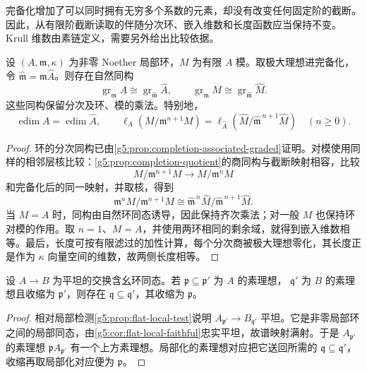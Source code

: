 完备化增加了可以同时拥有无穷多个系数的元素，却没有改变任何固定阶的截断。因此，从有限阶截断读取的伴随分次环、嵌入维数和长度函数应当保持不变。Krull 维数由素链定义，需要另外给出比较依据。

\begin{proposition}\label{g5:prop:completion-graded-comparison}
	设 \((A,\mathfrak m,\kappa)\) 为非零 Noether 局部环，\(M\) 为有限 \(A\) 模。取极大理想进完备化，令 \(\widehat{\mathfrak m}=\mathfrak m\widehat A\)。则存在自然同构
	\[
		\operatorname{gr}_{\mathfrak m}A
		\cong\operatorname{gr}_{\widehat{\mathfrak m}}\widehat A,
		\qquad
		\operatorname{gr}_{\mathfrak m}M
		\cong\operatorname{gr}_{\widehat{\mathfrak m}}\widehat M.
	\]
	这些同构保留分次及环、模的乘法。特别地，
	\[
		\operatorname{edim}A=\operatorname{edim}\widehat A,\qquad
		\ell_A(M/\mathfrak m^{n+1}M)
		=\ell_{\widehat A}(\widehat M/\widehat{\mathfrak m}^{\,n+1}\widehat M)
		\quad(n\geq0).
	\]
\end{proposition}
\begin{proof}
	环的分次同构已由\cref{g5:prop:completion-associated-graded}证明。对模使用同样的相邻层核比较：\cref{g5:prop:completion-quotient}的商同构与截断映射相容，比较
	\[
		M/\mathfrak m^{n+1}M\longrightarrow M/\mathfrak m^nM
	\]
	和完备化后的同一映射，并取核，得到
	\[
		\mathfrak m^nM/\mathfrak m^{n+1}M
		\cong
		\widehat{\mathfrak m}^{\,n}\widehat M/
		\widehat{\mathfrak m}^{\,n+1}\widehat M.
	\]
	当 \(M=A\) 时，同构由自然环同态诱导，因此保持齐次乘法；对一般 \(M\) 也保持环对模的作用。取 \(n=1\)、\(M=A\)，并使用两环相同的剩余域，就得到嵌入维数相等。最后，长度可按有限滤过的加性计算，每个分次商被极大理想零化，其长度正是作为 \(\kappa\) 向量空间的维数，故两侧长度相等。
\end{proof}

\begin{lemma}\label{g5:lem:flat-going-down}
	设 \(A\to B\) 为平坦的交换含幺环同态。若
	\(\mathfrak p\subseteq\mathfrak p'\) 为 \(A\) 的素理想，
	\(\mathfrak q'\) 为 \(B\) 的素理想且收缩为 \(\mathfrak p'\)，则存在
	\(\mathfrak q\subseteq\mathfrak q'\)，其收缩为 \(\mathfrak p\)。
\end{lemma}
\begin{proof}
	相对局部检测\cref{g5:prop:flat-local-test}说明
	\(A_{\mathfrak p'}\to B_{\mathfrak q'}\) 平坦。它是非零局部环之间的局部同态，由\cref{g5:cor:flat-local-faithful}忠实平坦，故谱映射满射。于是 \(A_{\mathfrak p'}\) 的素理想 \(\mathfrak pA_{\mathfrak p'}\) 有一个上方素理想。局部化的素理想对应把它送回所需的 \(\mathfrak q\subseteq\mathfrak q'\)，收缩再取局部化对应便为 \(\mathfrak p\)。
\end{proof}

